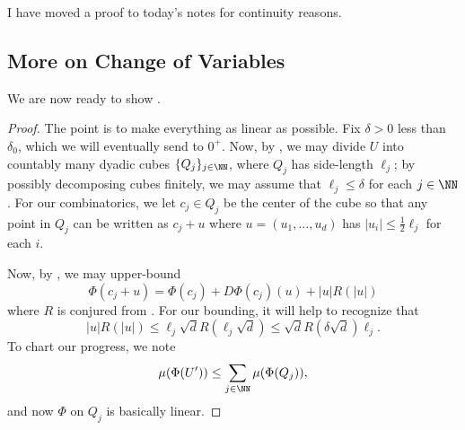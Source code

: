\documentclass[../notes.tex]{subfiles}
\begin{document}
I have moved a proof to today's notes for continuity reasons.

\subsection{More on Change of Variables}
We are now ready to show .
\boundchangevarslem*
\begin{proof}
	The point is to make everything as linear as possible. Fix $\delta>0$ less than $\delta_0$, which we will eventually send to $0^+$. Now, by , we may divide $U$ into countably many dyadic cubes $\{Q_j\}_{j\in\NN}$, where $Q_j$ has side-length $\ell_j$; by possibly decomposing cubes finitely, we may assume that $\ell_j\le\delta$ for each $j\in\NN$. For our combinatorics, we let $c_j\in Q_j$ be the center of the cube so that any point in $Q_j$ can be written as $c_j+u$ where $u=(u_1,\ldots,u_d)$ has $\left|u_i\right|\le\frac12\ell_j$ for each $i$.
	
	Now, by , we may upper-bound
	\[\Phi(c_j+u)=\Phi(c_j)+D\Phi(c_j)(u)+\left|u\right|R(\left|u\right|)\]
	where $R$ is conjured from . For our bounding, it will help to recognize that
	\[\left|u\right|R(\left|u\right|)\le\ell_j\sqrt dR(\ell_j\sqrt d)\le\sqrt dR(\delta\sqrt d)\ell_j.\]
	To chart our progress, we note
	\[\mu(\Phi(U'))\le\sum_{j\in\NN}\mu(\Phi(Q_j)),\]
	and now $\Phi$ on $Q_j$ is basically linear.


\end{proof}
\end{document}

